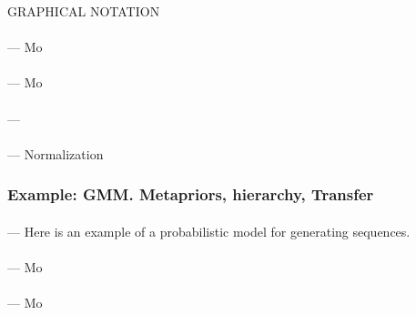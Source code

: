 \documentclass[12pt]{article}
\begin{document}



        GRAPHICAL NOTATION
        \paragraph{\sf} --- Mo
        \paragraph{\sf} --- Mo
        \paragraph{\sf} ---
        \paragraph{\sf} --- Normalization

      \subsubsection*{Example: GMM.  Metapriors, hierarchy, Transfer}
        \paragraph{\sf} --- Here is an example of a probabilistic model for
        generating sequences.
        \paragraph{\sf} --- Mo
        \paragraph{\sf} --- Mo
\end{document}
